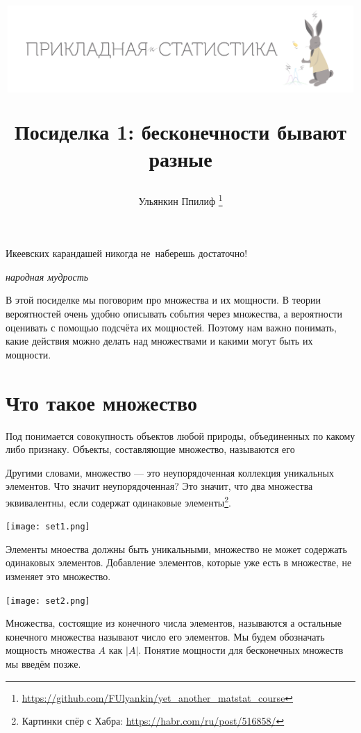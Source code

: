 \documentclass[12pt, a4paper]{article}
\title{
\begin{center} 
\includegraphics[width=0.99\textwidth]{images/logo.png}
\end{center}

Посиделка 1: бесконечности бывают разные}
\date{ } %
\author{Ульянкин Ппилиф \thanks{\url{https://github.com/FUlyankin/yet_another_matstat_course}}}
\begin{document}

\maketitle

\epigraph{Икеевских карандашей никогда не~наберешь достаточно!}{\textit{народная мудрость}}

В этой посиделке мы поговорим про множества и их мощности. В теории вероятностей очень удобно описывать события через множества, а вероятности оценивать с помощью подсчёта их мощностей. Поэтому нам важно понимать, какие действия можно делать над множествами и какими могут быть их мощности.

\section{Что такое множество} 

\begin{mydef}
Под  понимается совокупность объектов любой природы, объединенных по какому либо признаку. Объекты, составляющие множество, называются его  
\end{mydef}

Другими словами, множество --- это неупорядоченная коллекция уникальных элементов. Что значит неупорядоченная? Это значит, что два множества эквивалентны, если содержат одинаковые элементы\footnote{Картинки спёр с Хабра: \url{https://habr.com/ru/post/516858/}}.

\begin{center}
    \texttt{[image: set1.png]}
\end{center}

Элементы мноества должны быть уникальными, множество не может содержать одинаковых элементов. Добавление элементов, которые уже есть в множестве, не изменяет это множество.

\begin{center}
    \texttt{[image: set2.png]}
\end{center}

\begin{mydef}
Множества, состоящие из конечного числа элементов, называются  а остальные   конечного множества называют число его элементов. Мы будем обозначать мощность множества $A$ как $|A|$. Понятие мощности для бесконечных множеств мы введём позже. 
\end{mydef}
\end{document}
